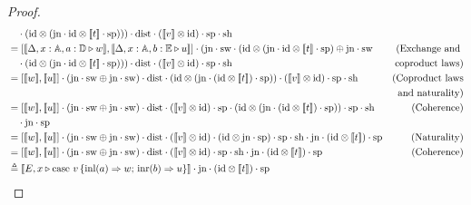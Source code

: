\documentclass[a4paper,UKenglish,cleveref, autoref, thm-restate]{lipics-v2021}
\begin{document}
\begin{proof}
\begin{align*}
  & \hspace{10pt}  \comp (\text{id} \otimes  (\text{jn}\comp \text{id} \otimes [\![t]\!] \comp \text{sp}) ))\comp \dist \comp ([\![v]\!] \otimes \text{id}) \comp \text{sp}\comp \text{sh}  \\
  & = [[\![ \Delta  , x:\typeA ,  a:\typeD \vljud w]\!] , [\![ \Delta  , x:\typeA ,  b:\typeE \vljud u]\!]]  \comp (  \text{jn} \comp \sw \comp (\text{id} \otimes  (\text{jn} \comp \id \otimes [\![t]\!]  \comp \text{sp})  \oplus \text{jn} \comp  \sw      & {(\text{Exchange and }}  \\
  & \hspace{10pt} \comp (\text{id} \otimes  (\text{jn} \comp \text{id} \otimes [\![t]\!] \comp \text{sp}) )  ) \comp \dist \comp ([\![v]\!] \otimes \text{id})   \comp \text{sp}\comp \text{sh}  & { \text{coproduct laws})}\\
  &= \left[[\![w ]\!] ,[\![ u]\!] \right] \comp  (\text{jn} \comp \sw \oplus \text{jn} \comp \sw)  \comp \dist \comp ( \text{id} \otimes (\text{jn} \cdot (\text{id} \otimes [\![t]\!]) \cdot \text{sp} ) ) \comp ([\![v]\!] \otimes \text{id}) \comp \text{sp} \comp \text{sh} & {(\text{Coproduct laws}}  \\
  & & {\text{and naturality}}) \\
  & =  \left[[\![w ]\!] ,[\![ u]\!] \right] \comp  (\text{jn} \comp \sw \oplus \text{jn}\comp \sw)  \comp \dist \comp  ([\![v]\!] \otimes \text{id}) \comp \text{sp} \comp ( \text{id} \otimes (\text{jn} \comp  (\text{id} \otimes [\![t]\!]) \cdot \text{sp} ) ) \comp \text{sp}\comp \text{sh}     & {(\text{Coherence})} \\
  &  \hspace{10pt}  \comp \text{jn}  \comp \text{sp} & \\
  & = \left[[\![w ]\!] ,[\![ u]\!] \right] \comp  (\text{jn} \comp \sw \oplus \text{jn} \comp \sw)  \comp \dist \comp  ([\![v]\!] \otimes \text{id})  \comp ( \id \otimes \text{jn} \comp \text{sp}) \comp \text{sp}  \comp \text{sh}    \comp \text{jn} \comp (\text{id} \otimes [\![ t ]\!] ) \comp \text{sp} & {(\text{Naturality})}   \\
  & =  [[\![w]\!], [\![u]\!]] \comp (\text{jn} \comp \sw \oplus \text{jn} \comp \sw)  \comp \dist   \comp ([\![v  ]\!] \otimes \text{id}) \comp \text{sp} \comp \text{sh} \comp \text{jn} \comp (\text{id} \otimes [\![ t ]\!] ) \comp \text{sp}  & {(\text{Coherence})}     \\ 
  & \triangleq  [\![E,  x\vljud \text{case } v\,  \{\text{inl} (a) \Rightarrow w ;\, \text{inr} (b) \Rightarrow u\}]\!] \comp \text{jn} \comp (\text{id} \otimes [\![ t ]\!] ) \comp \text{sp}
\end{align*}
\end{proof}
\end{document}
